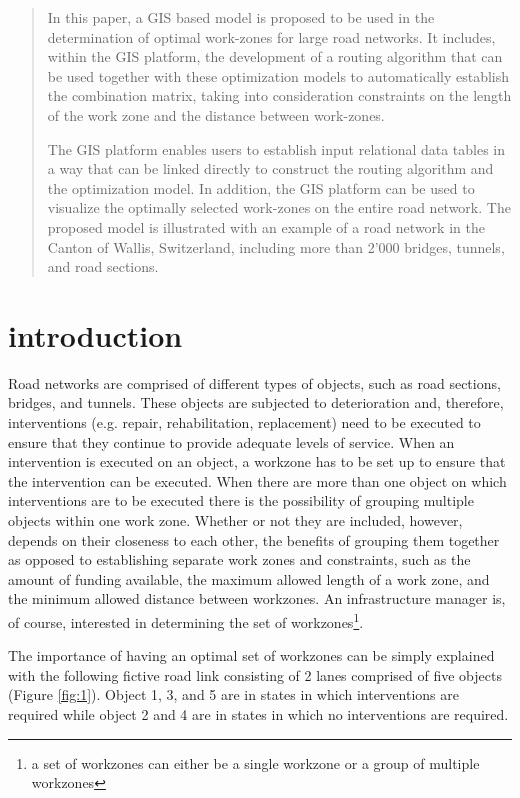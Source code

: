 \documentclass[10pt]{article}
\begin{document}
\begin{abstract}
In this paper, a GIS based model is proposed to be used in the determination of optimal work-zones for large road networks. It includes, within the GIS platform, the development of a routing algorithm that can be used together with these optimization models to automatically establish the combination matrix, taking into consideration constraints on the length of the work zone and the distance between work-zones. 

The GIS platform enables users to establish input relational data tables in a way that can be linked directly to construct the routing algorithm and the optimization model. In addition, the GIS platform can be used to visualize the optimally selected work-zones on the entire road network. The proposed model is illustrated with an example of a road network in the Canton of Wallis, Switzerland, including more than 2'000 bridges, tunnels, and road sections. 
\end{abstract}
\section{introduction}

Road networks are comprised of different types of objects, such as road
sections, bridges, and tunnels. These objects are subjected to deterioration and,
therefore, interventions (e.g. repair, rehabilitation, replacement) need to be
executed to ensure that they continue to provide adequate levels of service. When
an intervention is executed on an object, a workzone has to be set up to ensure
that the intervention can be executed. When there are more than one object on
which interventions are to be executed there is the possibility of grouping
multiple objects within one work zone. Whether or not they are included, however,
depends on their closeness to each other, the benefits of grouping them together
as opposed to establishing separate work zones and constraints, such as the
amount of funding available, the maximum allowed length of a work zone, and the
minimum allowed distance between workzones. An infrastructure manager is, of
course, interested in determining the set of workzones\footnote{a set of
workzones can either be a single workzone or a group of multiple workzones}.

The importance of having an optimal set of workzones can be simply explained
with the following fictive road link consisting of 2 lanes comprised of five
objects (Figure \ref{fig:1}). Object 1, 3, and 5 are in states in which
interventions are required while object 2 and 4 are in states in which no
interventions are required.
\end{document}

